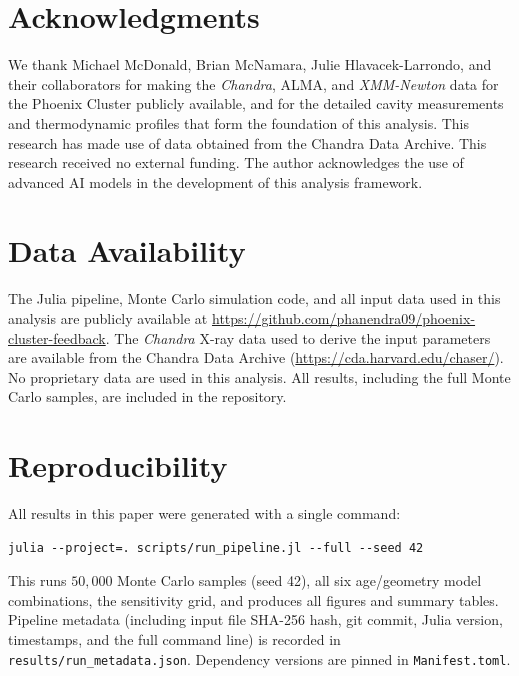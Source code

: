 \documentclass[twocolumn]{aastex63}
\begin{document}
\section*{Acknowledgments}

We thank Michael McDonald, Brian McNamara, Julie Hlavacek-Larrondo, and their
collaborators for making the \textit{Chandra}, ALMA, and \textit{XMM-Newton}
data for the Phoenix Cluster publicly available, and for the detailed cavity
measurements and thermodynamic profiles that form the foundation of this
analysis. This research has made use of data obtained from the Chandra Data
Archive. This research received no external funding. The author acknowledges the
use of advanced AI models in the development of this analysis framework.

\section*{Data Availability}

The Julia pipeline, Monte Carlo simulation code, and all input data used in this
analysis are publicly available at
\url{https://github.com/phanendra09/phoenix-cluster-feedback}. The
\textit{Chandra} X-ray data used to derive the input parameters are available
from the Chandra Data Archive (\url{https://cda.harvard.edu/chaser/}). No
proprietary data are used in this analysis. All results, including the full Monte
Carlo samples, are included in the repository.



\section*{Reproducibility}

All results in this paper were generated with a single command:
\begin{verbatim}
julia --project=. scripts/run_pipeline.jl --full --seed 42
\end{verbatim}
This runs $50{,}000$ Monte Carlo samples (seed 42), all six age/geometry model
combinations, the sensitivity grid, and produces all figures and summary tables.
Pipeline metadata (including input file SHA-256 hash, git commit, Julia version,
timestamps, and the full command line) is recorded in
\texttt{results/run\_metadata.json}. Dependency versions are pinned in
\texttt{Manifest.toml}.



\end{document}
